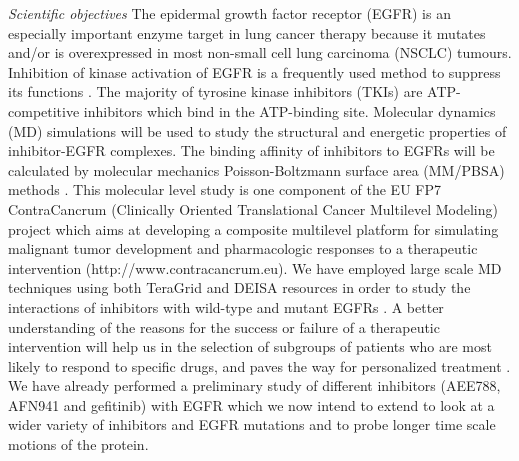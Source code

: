 \begin{compactenum}[a)]
\item \emph{Scientific objectives} 
The epidermal growth factor receptor (EGFR) is an especially important enzyme target in lung cancer therapy because it mutates and/or is overexpressed in most non-small cell lung carcinoma (NSCLC) tumours. Inhibition of kinase activation of EGFR is a frequently used method to suppress its functions \cite{bib:nature_tki}. The majority of tyrosine kinase inhibitors (TKIs) are ATP-competitive inhibitors which bind in the ATP-binding site. Molecular dynamics (MD) simulations will be used to study the structural and energetic properties of inhibitor-EGFR complexes. The binding affinity of inhibitors to EGFRs will be calculated by molecular mechanics Poisson-Boltzmann surface area (MM/PBSA) methods \cite{bib:wan_philtrans}. This molecular level study is one component of the EU FP7 ContraCancrum (Clinically Oriented Translational Cancer Multilevel Modeling) project which aims at developing a composite multilevel platform for simulating malignant tumor development and pharmacologic responses to a therapeutic intervention (http://www.contracancrum.eu). We have employed large scale MD techniques using both TeraGrid and DEISA resources in order to study the interactions of inhibitors with wild-type and mutant EGFRs \cite{bib:wc2009}. A better understanding of the reasons for the success or failure of a therapeutic intervention will help us in the selection of subgroups of patients who are most likely to respond to specific drugs, and paves the way for personalized treatment \cite{bib:hiv}. We have already performed a preliminary study of different inhibitors (AEE788, AFN941 and gefitinib) with EGFR which we now intend to extend to look at a wider variety of inhibitors and EGFR mutations and to probe longer time scale motions of the protein.



\end{compactenum}
